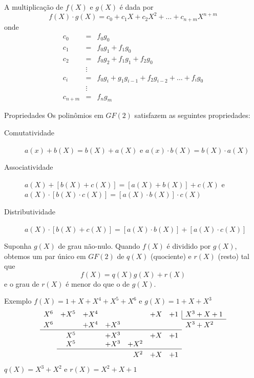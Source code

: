 \documentclass[portuguese,aspectratio=169]{beamer}
\begin{document}
\begin{frame}[allowframebreaks]
  \framebreak
  A multiplicação de $f(X)$ e $g(X)$ é dada por
  \begin{equation}
    f(X) \cdot g(X) = c_0 + c_1 X + c_2 X^2 + \ldots + c_{n+m} X^{n+m}
  \end{equation}
  onde
  \begin{eqnarray}
    c_0 &=& f_0 g_0 \nonumber\\
    c_1 &=& f_0 g_1 + f_1 g_0 \nonumber\\
    c_2 &=& f_0 g_2 + f_1 g_1 + f_2 g_0 \nonumber\\
        &\vdots& \nonumber\\
    c_i &=& f_0 g_i + g_1 g_{i-1} + f_2 g_{i-2} + \ldots + f_i g_0 \nonumber\\
        &\vdots& \nonumber\\
    c_{n+m} &=& f_n g_m
  \end{eqnarray}

  \framebreak
  \begin{block}{Propriedades}
    Os polinômios em $GF(2)$ satisfazem as seguintes propriedades:
    \begin{description}
      \item[Comutatividade] $a(x) + b(X) = b(X) + a(X)$ e $a(x) \cdot b(X) = b(X) \cdot a(X)$
      \item[Associatividade] $a(X) + [b(X) + c(X)] = [a(X) + b(X)] + c(X)$ e $a(X) \cdot [b(X) \cdot c(X)] = [a(X) \cdot b(X)] \cdot c(X)$
      \item[Distributividade] $a(X) \cdot [b(X) + c(X)] = [a(X) \cdot b(X)] + [a(X) \cdot c(X)]$
    \end{description}
  \end{block}

  \framebreak
  Suponha $g(X)$ de grau não-nulo. Quando $f(X)$ é dividido por $g(X)$, obtemos um par único em $GF(2)$ de $q(X)$ (quociente) e $r(X)$ (resto) tal que
  \begin{equation}
    f(X) = q(X) g(X) + r(X)
  \end{equation}
  e o grau de $r(X)$ é menor do que o de $g(X)$.

  \framebreak
  \begin{block}{Exemplo}
    $f(X) = 1 + X + X^4 + X^5 + X^6$ e $g(X) = 1 + X + X^3$
    \[
      \begin{array}{rrrrrrrl}
        X^6 &+ X^5 &+ X^4 &&&+ X &+ 1 & \multicolumn{1}{| l}{X^3 + X + 1} \\
        \cline{8-8}
        \rule{0pt}{2.6ex}
        X^6 &&+ X^4 &+ X^3 &&& & X^3 + X^2 \\
        \cline{1-7}
        \rule{0pt}{2.6ex}
         & X^5 &&+ X^3 &&+ X &+ 1 & \\
         & X^5 &&+ X^3 &+ X^2 &&& \\
        \cline{2-7}
        \rule{0pt}{2.6ex}
         &&&& X^2 &+ X &+ 1 &
      \end{array}
    \]
    $q(X) = X^3 + X^2$ e $r(X) = X^2 + X + 1$
  \end{block}


\end{frame}
\end{document}
